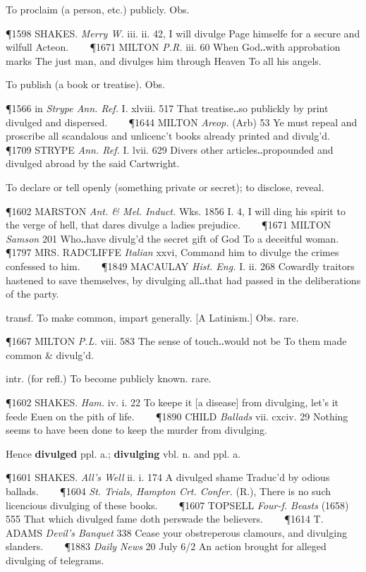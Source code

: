 \begin{description}[wide, labelwidth=!, labelindent=0pt]
\begin{myenumerate}
 To proclaim (a person, etc.) publicly. Obs.

\P 1598 SHAKES.  \textit{Merry W.} iii. ii. 42, I will divulge Page himselfe for a secure and wilfull Acteon.    
\P 1671 MILTON  \textit{P.R.} iii. 60 When God‥with approbation marks The just man, and divulges him through Heaven To all his angels.

 To publish (a book or treatise). Obs.

\P 1566 in  \textit{Strype Ann. Ref.} I. xlviii. 517 That treatise‥so publickly by print divulged and dispersed.    
\P 1644 MILTON  \textit{Areop.} (Arb) 53 Ye must repeal and proscribe all scandalous and unlicenc't books already printed and divulg'd.    
\P 1709 STRYPE  \textit{Ann. Ref.} I. lvii. 629 Divers other articles‥propounded and divulged abroad by the said Cartwright.

 To declare or tell openly (something private or secret); to disclose, reveal.

\P 1602 MARSTON  \textit{Ant. \& Mel. Induct.} Wks. 1856 I. 4, I  will ding his spirit to the verge of hell, that dares divulge a ladies prejudice.    
\P 1671 MILTON  \textit{Samson} 201 Who‥have divulg'd the secret gift of God To a deceitful woman.    
\P 1797 MRS. RADCLIFFE  \textit{Italian} xxvi, Command him to divulge the crimes confessed to him.    
\P 1849 MACAULAY  \textit{Hist. Eng.} I. ii. 268 Cowardly traitors hastened to save themselves, by divulging all‥that had passed in the deliberations of the party.

 transf. To make common, impart generally. [A Latinism.] Obs. rare.

\P 1667 MILTON  \textit{P.L.} viii. 583 The sense of touch‥would not be To them made common \& divulg'd.

 intr. (for refl.) To become publicly known. rare.

\P 1602 SHAKES.  \textit{Ham.} iv. i. 22 To keepe it [a disease] from divulging, let's it feede Euen on the pith of life.    
\P 1890 CHILD  \textit{Ballads} vii. cxciv. 29 Nothing seems to have been done to keep the murder from divulging.

\noindent Hence \textbf{divulged} ppl. a.; \textbf{divulging} vbl. n. and ppl. a.

\P 1601 SHAKES.  \textit{All's Well} ii. i. 174 A divulged shame Traduc'd by odious ballads.    
\P 1604 \textit{St. Trials,  Hampton Crt. Confer.} (R.), There is no such licencious divulging of these books.    
\P 1607 TOPSELL  \textit{Four-f. Beasts} (1658) 555 That which divulged fame doth perswade the believers.    
\P 1614 T. ADAMS  \textit{Devil's Banquet} 338 Cease your obstreperous clamours, and divulging slanders.    
\P 1883  \textit{Daily News} 20 July 6/2 An action brought for alleged divulging of telegrams.
\end{myenumerate}



\end{description}

